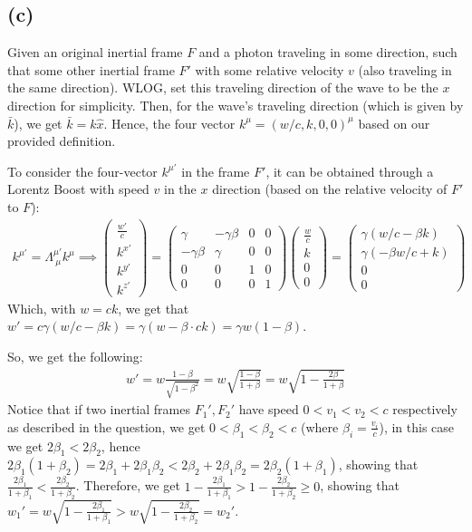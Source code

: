 \documentclass{article}
\begin{document}
\subsection*{(c)}
Given an original inertial frame $F$ and a photon traveling in some direction, such that some other inertial frame $F'$ with some relative velocity $v$ (also traveling in the same direction). WLOG, set this traveling direction of the wave to be the $x$ direction for simplicity. Then, for the wave's traveling direction (which is given by $\bar{k}$), we get $\bar{k} = k\hat{x}$. Hence, the four vector $k^\mu = (w/c, k, 0,0)^\mu$ based on our provided definition. 

To consider the four-vector $k^{\mu'}$ in the frame $F'$, it can be obtained through a Lorentz Boost with speed $v$ in the $x$ direction (based on the relative velocity of $F'$ to $F$):
\begin{align}
    k^{\mu'} = \Lambda^{\mu'}_{\ \mu}k^\mu \implies \begin{pmatrix}
        \frac{w'}{c}\\k^{x'}\\k^{y'}\\k^{z'}
    \end{pmatrix}=\begin{pmatrix}
        \gamma & -\gamma\beta&0&0\\
        -\gamma\beta&\gamma&0&0\\
        0&0&1&0\\0&0&0&1
    \end{pmatrix}\begin{pmatrix}
        \frac{w}{c}\\k\\0\\0
    \end{pmatrix} = \begin{pmatrix}
        \gamma(w/c - \beta k)\\ \gamma(-\beta w/c+k)\\0\\0
    \end{pmatrix}
\end{align}
Which, with $w=ck$, we get that $w' = c\gamma(w/c-\beta k) = \gamma(w-\beta\cdot ck) = \gamma w(1-\beta)$.

So, we get the following:
\begin{align}
    w' = w\frac{1-\beta}{\sqrt{1-\beta^2}} = w\sqrt{\frac{1-\beta}{1+\beta}} = w\sqrt{1-\frac{2\beta}{1+\beta}}
\end{align}
Notice that if two inertial frames $F_1', F_2'$ have speed $0<v_1<v_2<c$ respectively as described in the question, we get $0<\beta_1<\beta_2<c$ (where $\beta_i = \frac{v_i}{c}$), in this case we get $2\beta_1 < 2\beta_2$, hence $2\beta_1 (1+\beta_2) = 2\beta_1 + 2\beta_1\beta_2 < 2\beta_2 + 2\beta_1\beta_2 = 2\beta_2(1+\beta_1)$, showing that $\frac{2\beta_1}{1+\beta_1}<\frac{2\beta_2}{1+\beta_2}$. Therefore, we get $1-\frac{2\beta_1}{1+\beta_1}>1-\frac{2\beta_2}{1+\beta_2}\geq 0$, showing that $w_1'=w\sqrt{1-\frac{2\beta_1}{1+\beta_1}}>w\sqrt{1-\frac{2\beta_2}{1+\beta_2}}=w_2'$.
\end{document}
